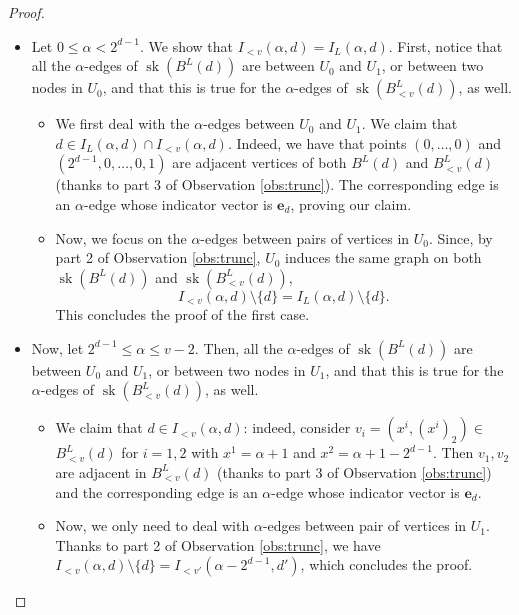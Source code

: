 \documentclass[11pt,a4paper]{article}
\newcommand{\1}{\textbf{1}}
\newcommand{\sk}{\operatorname{sk}}
\begin{document}
\begin{proof}
\begin{itemize}
    \item Let $0\leq \alpha<2^{d-1}$. We show that $I_{<v}(\alpha,d)=I_L(\alpha,d)$. %
    First, notice that all the $\alpha$-edges of $\sk(B^L(d))$ are between $U_0$ and $U_1$, or between two nodes in $U_0$, and that this is true for the $\alpha$-edges of $\sk(B^L_{<v}(d))$, as well. 
    \begin{itemize}
    \item We first deal with the $\alpha$-edges between $U_0$ and $U_1$. We claim that $d\in I_L(\alpha,d)\cap I_{<v}(\alpha,d)$. Indeed, we have that points $(0,\dots, 0)$ and $(2^{d-1},0,\dots,0,1)$ are adjacent vertices of both $B^L(d)$ and $B^L_{<v}(d)$ (thanks to part 3 of Observation \ref{obs:trunc}). The corresponding edge is an $\alpha$-edge whose indicator vector is $\mathbf{e}_{d}$, proving our claim.
    \item Now, we focus on the $\alpha$-edges between pairs of vertices in $U_0$. Since,  by part 2 of Observation \ref{obs:trunc}, $U_0$ induces the same graph on both $\sk(B^L(d))$ and $\sk(B^L_{<v}(d))$,%
     \[
    I_{<v}(\alpha,d)\setminus\{d\}= I_{L}(\alpha,d)\setminus\{d\}.\] 
    This concludes the proof of the first case.
  \end{itemize}  
    \item Now, let $2^{d-1}\leq \alpha \leq v-2$. Then, all the $\alpha$-edges of $\sk(B^L(d))$ are between $U_0$ and $U_1$, or between two nodes in $U_1$, and that this is true for the $\alpha$-edges of $\sk(B^L_{<v}(d))$, as well. 
\begin{itemize}
    \item We claim that $d\in I_{<v}(\alpha,d)$: indeed, consider $v_i=(x^i,(x^i)_2)\in$ $B^L_{<v}(d)$ for $i=1,2$ with $x^1=\alpha+1$ and $x^2=\alpha+1-2^{d-1}$. Then $v_1, v_2$ are adjacent in $B^L_{<v}(d)$ (thanks to part 3 of Observation \ref{obs:trunc}) and the corresponding edge is an $\alpha$-edge whose indicator vector is $\mathbf{e}_{d}$.
    \item Now, we only need to deal with $\alpha$-edges between pair of vertices in $U_1$. Thanks to part 2 of Observation \ref{obs:trunc}, we have $I_{<v}(\alpha,d)\setminus\{d\}= I_{<v'}(\alpha-2^{d-1},d')$, which concludes the proof.
\end{itemize}
\end{itemize}








\end{proof}
\end{document}
